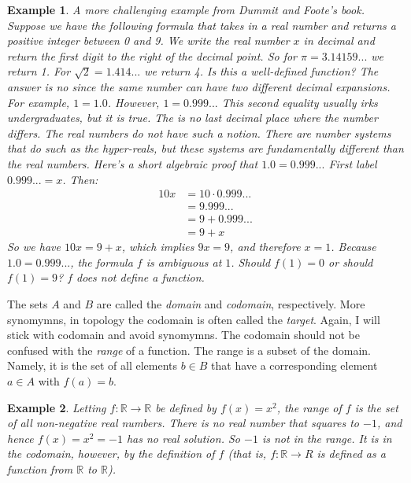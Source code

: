 \documentclass{article}
\theoremstyle{plain}
\theoremstyle{normal}
\newtheorem{example}{Example}[section]
\begin{document}
        \begin{example}
            A more challenging example from Dummit and Foote's book. Suppose
            we have the following formula that takes in a real number and
            returns a positive integer between 0 and 9. We write the real
            number $x$ in decimal and return the first digit to the right of
            the decimal point. So for $\pi=3.14159...$ we return 1. For
            $\sqrt{2}=1.414...$ we return 4. Is this a well-defined function?
            The answer is no since the same number can have two different
            decimal expansions. For example, $1=1.0$. However,
            $1=0.999...$ This second equality usually irks undergraduates, but
            it is true. The is no \textit{last decimal place} where the
            number differs. The real numbers do not have such a notion. There
            are number systems that do such as the hyper-reals, but these
            systems are fundamentally different than the real numbers. Here's
            a short algebraic proof that $1.0=0.999...$ First label
            $0.999...=x$. Then:
            \begin{align}
                10x&=10\cdot0.999...\\
                    &=9.999...\\
                    &=9+0.999...\\
                    &=9+x
            \end{align}
            So we have $10x=9+x$, which implies $9x=9$, and therefore $x=1$.
            Because $1.0=0.999...$, the formula $f$ is ambiguous at $1$.
            Should $f(1)=0$ or should $f(1)=9$? $f$ does not define a function.
        \end{example}
        The sets $A$ and $B$ are called the \textit{domain} and
        \textit{codomain}, respectively. More synomymns, in topology the
        codomain is often called the \textit{target}. Again, I will stick with
        codomain and avoid synomymns. The codomain should not be confused with
        the \textit{range} of a function. The range is a subset of the domain.
        Namely, it is the set of all elements $b\in{B}$ that have a
        corresponding element $a\in{A}$ with $f(a)=b$.
        \begin{example}
            Letting $f:\mathbb{R}\rightarrow\mathbb{R}$ be defined by
            $f(x)=x^{2}$, the range of $f$ is the set of all
            \textit{non-negative} real numbers. There is no real number that
            squares to $-1$, and hence $f(x)=x^{2}=-1$ has no real solution.
            So $-1$ is \textit{not} in the range. It is in the codomain,
            however, by the definition of $f$
            (that is, $f:\mathbb{R}\rightarrow{R}$ is defined as a function
            from $\mathbb{R}$ to $\mathbb{R}$).
        \end{example}
\end{document}
